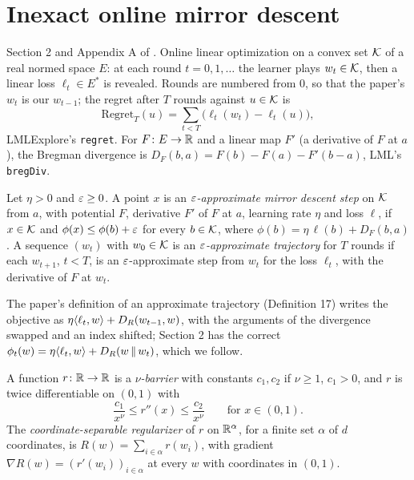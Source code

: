 \chapter{Inexact online mirror descent}
\label{chap:setting}

Section 2 and Appendix A of \cite{SSKM26}. Online linear optimization on a convex set $\mathcal{K}$ of a
real normed space $E$: at each round $t = 0, 1, \dots$ the learner plays $w_t \in \mathcal{K}$, then a
linear loss $\ell_t \in E^*$ is revealed. Rounds are numbered from $0$, so that the paper's
$w_t$ is our $w_{t-1}$; the regret after $T$ rounds against $u \in \mathcal{K}$ is
\[ \mathrm{Regret}_T(u) = \sum_{t < T} \bigl(\ell_t(w_t) - \ell_t(u)\bigr), \]
LMLExplore's \texttt{regret}. For $F \colon E \to \mathbb{R}$ and a linear map $F'$ (a derivative of $F$
at $a$), the Bregman divergence is $D_F(b, a) = F(b) - F(a) - F'(b - a)$, LML's
\texttt{bregDiv}.

\begin{definition}
  \label{def:approx_step}
  \leanok
  Let $\eta > 0$ and $\varepsilon \ge 0$. A point $x$ is an \emph{$\varepsilon$-approximate mirror descent
  step} on $\mathcal{K}$ from $a$, with potential $F$, derivative $F'$ of $F$ at $a$, learning rate $\eta$
  and loss $\ell$, if $x \in \mathcal{K}$ and $\phi(x) \le \phi(b) + \varepsilon$ for every $b \in \mathcal{K}$, where
  $\phi(b) = \eta\, \ell(b) + D_F(b, a)$. A sequence $(w_t)$ with $w_0 \in \mathcal{K}$ is an
  \emph{$\varepsilon$-approximate trajectory} for $T$ rounds if each $w_{t+1}$, $t < T$, is an
  $\varepsilon$-approximate step from $w_t$ for the loss $\ell_t$, with the derivative of $F$ at $w_t$.
\end{definition}

The paper's definition of an approximate trajectory (Definition 17) writes the objective as
$\eta\langle \ell_t, w \rangle + D_R(w_{t-1}, w)$, with the arguments of the divergence swapped and an index
shifted; Section 2 has the correct $\phi_t(w) = \eta\langle \ell_t, w \rangle + D_R(w \,\|\, w_t)$, which we
follow.

\begin{definition}
  \label{def:power_barrier}
  \leanok
  A function $r \colon \mathbb{R} \to \mathbb{R}$ is a \emph{$\nu$-barrier} with constants $c_1, c_2$ if
  $\nu \ge 1$, $c_1 > 0$, and $r$ is twice differentiable on $(0, 1)$ with
  \[ \frac{c_1}{x^\nu} \le r''(x) \le \frac{c_2}{x^\nu} \qquad \text{for } x \in (0, 1). \]
  The \emph{coordinate-separable regularizer} of $r$ on $\mathbb{R}^\alpha$, for a finite set $\alpha$ of
  $d$ coordinates, is $R(w) = \sum_{i \in \alpha} r(w_i)$, with gradient
  $\nabla R(w) = (r'(w_i))_{i \in \alpha}$ at every $w$ with coordinates in $(0, 1)$.
\end{definition}

